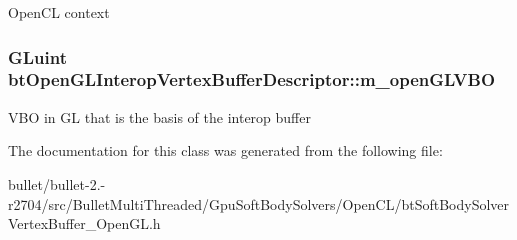 Open\+C\+L context \hypertarget{classbt_open_g_l_interop_vertex_buffer_descriptor_aceb2909c30dc9fb57520211254e5d8e8}{
\subsubsection[{m\+\_\+open\+G\+L\+V\+B\+O}]{\setlength{\rightskip}{0pt plus 5cm}G\+Luint bt\+Open\+G\+L\+Interop\+Vertex\+Buffer\+Descriptor\+::m\+\_\+open\+G\+L\+V\+B\+O\hspace{0.3cm}{\ttfamily [protected]}}}\label{classbt_open_g_l_interop_vertex_buffer_descriptor_aceb2909c30dc9fb57520211254e5d8e8}
V\+B\+O in G\+L that is the basis of the interop buffer 

The documentation for this class was generated from the following file\+:\begin{DoxyCompactItemize}
\item 
bullet/bullet-\/2.-\/r2704/src/\+Bullet\+Multi\+Threaded/\+Gpu\+Soft\+Body\+Solvers/\+Open\+C\+L/bt\+Soft\+Body\+Solver\+Vertex\+Buffer\+\_\+\+Open\+G\+L.\+h\end{DoxyCompactItemize}
